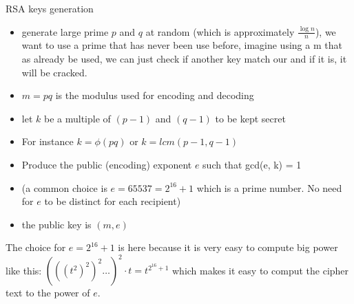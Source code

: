        
\begin{parag}{RSA keys generation}
    \begin{itemize}
        \item generate large prime $p$ and $q$ at random (which is approximately $\frac{\log n}{n}$), we want to use a prime that has never been use before, imagine using a m that as already be used, we can just check if another key match our and if it is, it will be cracked.
        \item $m = pq$ is the modulus used for encoding and decoding
        \item let $k$ be a multiple of $\left(p-1\right)$ and $\left(q-1\right)$ to be kept secret
        \item For instance $k = \phi\left(pq\right)$ or $k = lcm\left(p-1, q-1\right)$
        \item Produce the public (encoding) exponent $e$ such that gcd(e, k) = 1
        \item (a common choice is $e = 65537 = 2^{16} + 1$ which is a prime number. No need for $e$ to be distinct for each recipient)
        \item the public key is $\left(m , e\right)$
        
    \end{itemize}
    The choice for $e = 2^{16} + 1$ is here because it is very easy to compute big power like this: $\left(\left(\left(t^2\right)^2\right)^2\ldots\right)^2 \cdot t = t^{2^{16} + 1}$ which makes it easy to comput the cipher text to the power of $e$.
    
    
\end{parag}

